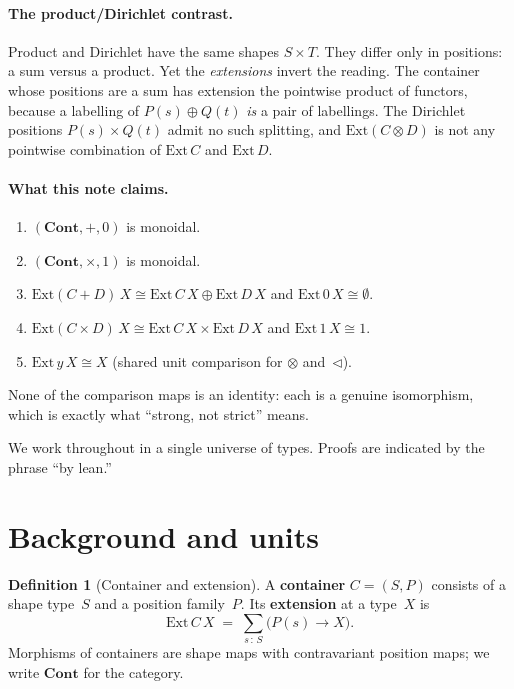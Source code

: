 \documentclass[11pt,a4paper]{article}
\theoremstyle{plain}
\theoremstyle{definition}
\newtheorem{definition}[theorem]{Definition}
\newcommand{\Cont}{\mathbf{Cont}}
\newcommand{\Ext}{\mathrm{Ext}}
\newcommand{\seq}{\mathbin{\triangleleft}}
\begin{document}
\paragraph{The product/Dirichlet contrast.}
Product and Dirichlet have the same shapes $S \times T$. They differ only
in positions: a sum versus a product. Yet the \emph{extensions} invert
the reading. The container whose positions are a sum has extension the
pointwise product of functors, because a labelling of $P(s)\oplus Q(t)$
\emph{is} a pair of labellings. The Dirichlet positions $P(s)\times Q(t)$
admit no such splitting, and $\Ext(C \otimes D)$ is not any pointwise
combination of $\Ext\,C$ and $\Ext\,D$.

\paragraph{What this note claims.}
\begin{enumerate}
  \item $(\Cont, +, 0)$ is monoidal.
  \item $(\Cont, \times, 1)$ is monoidal.
  \item $\Ext(C+D)\,X \cong \Ext\,C\,X \oplus \Ext\,D\,X$ and
        $\Ext\,0\,X \cong \emptyset$.
  \item $\Ext(C \times D)\,X \cong \Ext\,C\,X \times \Ext\,D\,X$ and
        $\Ext\,1\,X \cong 1$.
  \item $\Ext\,y\,X \cong X$ (shared unit comparison for $\otimes$
        and~$\seq$).
\end{enumerate}
None of the comparison maps is an identity: each is a genuine
isomorphism, which is exactly what ``strong, not strict'' means.

We work throughout in a single universe of types. Proofs are indicated by
the phrase ``by lean.''

\section{Background and units}

\begin{definition}[Container and extension]\label{def:container}
A \textbf{container} $C = (S,P)$ consists of a shape type~$S$ and a
position family~$P$. Its \textbf{extension} at a type~$X$ is
\begin{equation}
  \Ext\,C\,X \;=\; \sum_{s \,:\, S} \bigl(P(s) \to X\bigr).
\end{equation}
Morphisms of containers are shape maps with contravariant position maps;
we write $\Cont$ for the category.
\end{definition}
\end{document}
